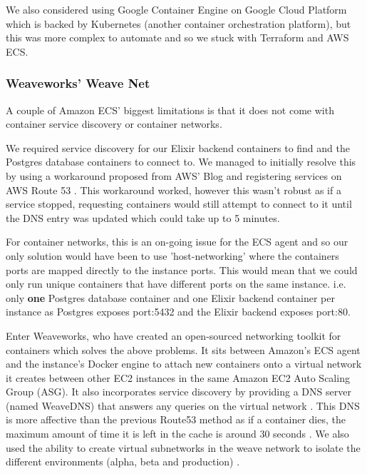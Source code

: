 \documentclass[11pt,a4paper]{report}
\begin{document}
We also considered using Google Container Engine on Google Cloud Platform which is backed by Kubernetes (another container orchestration platform), but this was more complex to automate and so we stuck with Terraform and AWS ECS.

\subsubsection{Weaveworks' Weave Net}

A couple of Amazon ECS' biggest limitations is that it does not come with container service discovery or container networks.

We required service discovery for our Elixir backend containers to find and the Postgres database containers to connect to. We managed to initially resolve this by using a workaround proposed from AWS' Blog and registering services on AWS Route 53 \cite{website:aws_ecs_dns}. This workaround worked, however this wasn't robust as if a service stopped, requesting containers would still attempt to connect to it until the DNS entry was updated which could take up to 5 minutes.

For container networks, this is an on-going issue for the ECS agent \cite{website:github_user_network_issue} and so our only solution would have been to use 'host-networking' where the containers ports are mapped directly to the instance ports. This would mean that we could only run unique containers that have different ports on the same instance. i.e. only \textbf{one} Postgres database container and one Elixir backend container per instance as Postgres exposes port:5432 and the Elixir backend exposes port:80.

Enter Weaveworks, who have created an open-sourced networking toolkit for containers which solves the above problems. It sits between Amazon's ECS agent and the instance's Docker engine to attach new containers onto a virtual network it creates between other EC2 instances in the same Amazon EC2 Auto Scaling Group (ASG). It also incorporates service discovery by providing a DNS server (named WeaveDNS) that answers any queries on the virtual network \cite{website:weave_dns}. This DNS is more affective than the previous Route53 method as if a container dies, the maximum amount of time it is left in the cache is around 30 seconds \cite{website:weave_dns_fault_tolerance}. We also used the ability to create virtual subnetworks in the weave network to isolate the different environments (alpha, beta and production) \cite{website:weave_subnet_allocation}.
\end{document}
